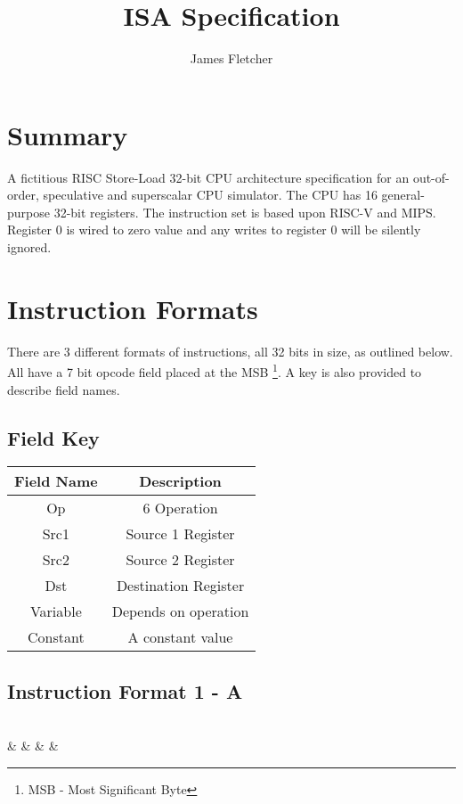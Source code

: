 \documentclass[]{article}
\title{ISA Specification}
\author{James Fletcher}
\begin{document}
\maketitle

\tableofcontents

\begin{abstract}

\end{abstract}

\section{Summary}
A fictitious RISC Store-Load 32-bit CPU architecture specification for an out-of-order, speculative and superscalar CPU simulator. The CPU has 16 general-purpose 32-bit registers. The instruction set is based upon RISC-V and MIPS. Register 0 is wired to zero value and any writes to register 0 will be silently ignored.

\section{Instruction Formats}
There are 3 different formats of instructions, all 32 bits in size, as outlined below. All have a 7 bit opcode field placed at the MSB \footnote{MSB - Most Significant Byte}. A key is also provided to describe field names. \vspace{2ex}

\subsection{Field Key}
\begin{tabular}{|c|c|} 
	\hline
	Field Name & Description \\
	\hline
	Op & 6 Operation \\ 
	\hline
	Src1 & Source 1 Register \\
	\hline
	Src2 & Source 2 Register \\
	\hline
	Dst & Destination Register \\
	\hline
	Variable & Depends on operation \\
	\hline
	Constant & A constant value \\
	\hline
\end{tabular}

\subsection{Instruction Format 1 - A}
\begin{bytefield}[endianness=big,bitwidth=.8em]{32}
	 \\
	 &  &  &  & 
\end{bytefield}
\end{document}
